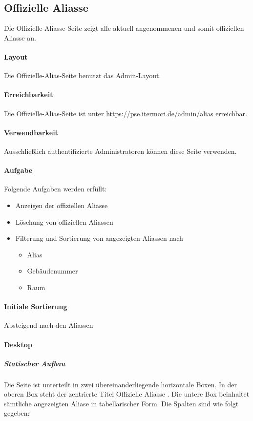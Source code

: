 \subsection{Offizielle Aliasse}

Die Offizielle-Aliasse-Seite zeigt alle aktuell angenommenen und somit offiziellen Aliasse an.

\paragraph*{Layout}
Die Offizielle-Alias-Seite benutzt das Admin-Layout.

\paragraph*{Erreichbarkeit}
Die Offizielle-Alias-Seite ist unter \href{https://pse.itermori.de/admin/alias}{https://pse.itermori.de/admin/alias} erreichbar.

\paragraph*{Verwendbarkeit}
Ausschließlich authentifizierte Administratoren können diese Seite verwenden.

\paragraph*{Aufgabe}
Folgende Aufgaben werden erfüllt:

\begin{itemize}
    \item Anzeigen der offiziellen Aliasse
    \item Löschung von offiziellen Aliassen
    \item Filterung und Sortierung von angezeigten Aliassen nach 
    \begin{itemize}
        \item Alias
        \item Gebäudenummer
        \item Raum
    \end{itemize}
\end{itemize}

\paragraph*{Initiale Sortierung}
Absteigend nach den Aliassen

\paragraph*{Desktop}
\subparagraph*{Statischer Aufbau}
Die Seite ist unterteilt in zwei übereinanderliegende horizontale Boxen.
In der oberen Box steht der zentrierte Titel \dq Offizielle Aliasse \dq.
Die untere Box beinhaltet sämtliche angezeigten Aliase in tabellarischer Form. Die Spalten sind wie folgt gegeben:


